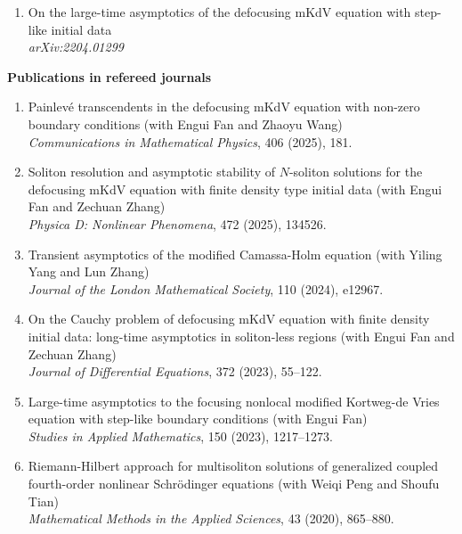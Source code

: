 \documentclass[margin]{res}
\begin{document}
\begin{resume}
\begin{enumerate}[1.]
    \item On the large-time asymptotics of the defocusing mKdV equation with step-like initial data \\
    {\sl arXiv:2204.01299}
\end{enumerate}

\textbf{Publications in refereed journals}
\begin{enumerate}[1.]
    \item Painlev\'{e} transcendents in the defocusing mKdV equation with non-zero boundary conditions (with Engui Fan and Zhaoyu Wang)\\
    {\sl Communications in Mathematical Physics}, 406 (2025), 181.

    \item Soliton resolution and asymptotic stability of $N$-soliton solutions for the defocusing mKdV equation with finite density type initial data (with Engui Fan and Zechuan Zhang)\\ 
    {\sl Physica D: Nonlinear Phenomena}, 472 (2025), 134526. 

    \item Transient asymptotics of the modified Camassa-Holm equation (with Yiling Yang and Lun Zhang) \\
    {\sl Journal of the London Mathematical Society}, 110 (2024), e12967. 

    \item On the Cauchy problem of defocusing mKdV equation with finite density initial data: long-time asymptotics in soliton-less regions (with Engui Fan and Zechuan Zhang)\\
    {\sl Journal of Differential Equations}, 372 (2023), 55--122.

    \item Large-time asymptotics to the focusing nonlocal modified Kortweg-de Vries equation with step-like boundary conditions (with Engui Fan)\\
    {\sl Studies in Applied Mathematics}, 150 (2023), 1217--1273. 
    
    \item Riemann-Hilbert approach for multisoliton solutions of generalized coupled fourth-order nonlinear Schr\"odinger equations
    (with Weiqi Peng and Shoufu Tian)\\
    {\sl Mathematical Methods in the Applied Sciences}, 43 (2020), 865--880.
\end{enumerate}


\end{resume}
\end{document}

